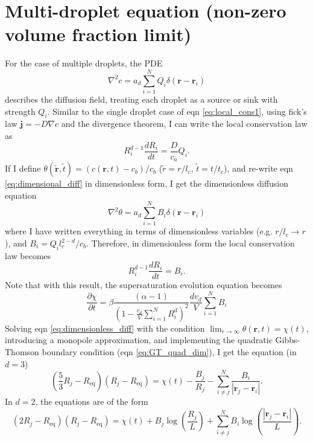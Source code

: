 \documentclass[12pt]{article}
\begin{document}
\section{Multi-droplet equation (non-zero volume fraction limit)}
For the case of multiple droplets, the PDE
\begin{equation}\label{eq:dimensional_diff}
\nabla^2c=a_d\sum_{i=1}^NQ_i\delta(\bm{r}-\bm{r}_i)
\end{equation}
describes the diffusion field, treating each droplet as a source or sink with strength $Q_i$. Similar to the single droplet case of eqn \ref{eq:local_cons1}, using fick's law $\bm{j}=-D\nabla c$ and the divergence theorem, I can write the local conservation law as
\begin{equation}\label{eq:local_cons2}
R_i^{d-1}\frac{d R_i}{d t}=\frac{D}{c_a}Q_i.
\end{equation}
If I define $\theta(\tilde{\bm{r}},\tilde{t})=(c(\bm{r},t)-c_b)/c_b$ ($\tilde{r}=r/l_c$, $\tilde{t}=t/t_c$), and re-write eqn \ref{eq:dimensional_diff} in dimensionless form, I get the dimensionless diffusion equation
\begin{equation}\label{eq:dimensionless_diff}
\nabla^2\theta=a_d\sum_{i=1}^NB_i\delta(\bm{r}-\bm{r}_i)
\end{equation}
where I have written everything in terms of dimensionless variables (e.g. $r/l_c\to r$), and $B_i = Q_il_c^{2-d}/c_b$. Therefore, in dimensionless form the local conservation law becomes
\begin{equation}\label{eq:local_cons3}
R_i^{d-1}\frac{dR_i}{dt}=B_i.
\end{equation}
Note that with this result, the supersaturation evolution equation becomes
\begin{equation}\label{eq:ss_evolution2}
\frac{\partial\chi}{\partial t}=\beta\frac{(\alpha-1)}{\left(1-\frac{v_d}{V}\sum_{i=1}^NR_i^d\right)^2}\frac{dv_d}{V}\sum_{i=1}^NB_i
\end{equation}
Solving eqn \ref{eq:dimensionless_diff} with the condition $\lim_{r\to\infty}\theta(\bm{r},t)=\chi(t)$, introducing a monopole approximation, and implementing the quadratic Gibbs-Thomson boundary condition (eqn \ref{eq:GT_quad_dim}), I get the equation (in $d=3$)
\begin{equation}\label{eq:system_of_eqns_Bi}
\left(\frac{5}{3}R_j-R_{\text{eq}}\right)(R_j-R_{\text{eq}})=\chi(t)-\frac{B_j}{R_j}-\sum_{i\neq j}^N\frac{B_i}{\left|\bm{r}_j-\bm{r}_i\right|}.
\end{equation}
In $d=2$, the equations are of the form
\begin{equation}\label{eq:system_of_eqns_Bi_2d}
\left(2R_j-R_{\text{eq}}\right)(R_j-R_{\text{eq}})=\chi(t)+B_j\log\left(\frac{R_j}{L}\right)+\sum_{i\neq j}^NB_i\log\left(\frac{\left|\bm{r}_j-\bm{r}_i\right|}{L}\right).
\end{equation}
\end{document}
